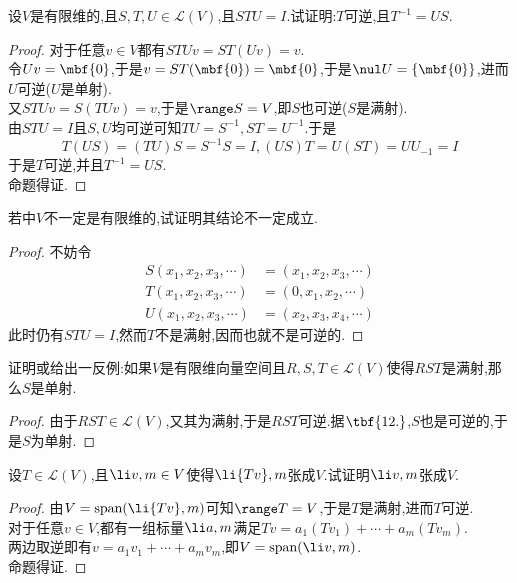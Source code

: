 \documentclass{ctexart}
\begin{document}
\begin{problem}[12.]
    设$V$是有限维的,且$S,T,U\in\mathcal{L}(V)$,且$STU=I$.试证明:$T$可逆,且$T^{-1}=US$.
\end{problem}
\begin{proof}
    对于任意$v\in V$都有$STUv=ST(Uv)=v$.\\
    令$Uv=\mbf{0}$,于是$v=ST(\mbf{0})=\mbf{0}$,于是$\nul U=\left\{\mbf{0}\right\}$,进而$U$可逆($U$是单射).\\
    又$STUv=S(TUv)=v$,于是$\range S=V$,即$S$也可逆($S$是满射).\\
    由$STU=I$且$S,U$均可逆可知$TU=S^{-1},ST=U^{-1}$.于是
    $$T(US)=(TU)S=S^{-1}S=I,(US)T=U(ST)=UU_{-1}=I$$
    于是$T$可逆,并且$T^{-1}=US$.\\
    命题得证.
\end{proof}
\begin{problem}[13.]
    若中$V$不一定是有限维的,试证明其结论不一定成立.
\end{problem}
\begin{proof}
    不妨令
    $$\begin{aligned}
        S(x_1,x_2,x_3,\cdots) &= (x_1,x_2,x_3,\cdots)\\
        T(x_1,x_2,x_3,\cdots) &= (0,x_1,x_2,\cdots) \\
        U(x_1,x_2,x_3,\cdots) &= (x_2,x_3,x_4,\cdots)
    \end{aligned}$$
    此时仍有$STU=I$,然而$T$不是满射,因而也就不是可逆的.
\end{proof}
\begin{problem}[14.]
    证明或给出一反例:如果$V$是有限维向量空间且$R,S,T\in\mathcal{L}(V)$使得$RST$是满射,那么$S$是单射.
\end{problem}
\begin{proof}
    由于$RST\in\mathcal{L}(V)$,又其为满射,于是$RST$可逆.据$\tbf{12.}$,$S$也是可逆的,于是$S$为单射.
\end{proof}
\begin{problem}[15.]
    设$T\in\mathcal{L}(V)$,且$\li v,m\in V$使得$\li {Tv},m$张成$V$.试证明$\li v,m$张成$V$.
\end{problem}
\begin{proof}
    由$V=\text{span}(\li{Tv},m)$可知$\range T=V$,于是$T$是满射,进而$T$可逆.\\
    对于任意$v\in V$,都有一组标量$\li a,m$满足$Tv=a_1(Tv_1)+\cdots+a_m(Tv_m)$.\\
    两边取逆即有$v=a_1v_1+\cdots+a_mv_m$,即$V=\text{span}(\li v,m)$.\\
    命题得证.
\end{proof}
\end{document}
